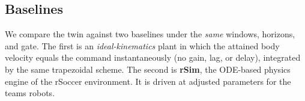 \subsection{Baselines}
\label{sec:method:baselines}
We compare the twin against two baselines under the \emph{same} windows, horizons, and gate. The first is an \emph{ideal-kinematics} plant in which the attained body velocity equals the command instantaneously (no gain, lag, or delay), integrated by the same trapezoidal scheme. The second is \textbf{rSim}, the ODE-based physics engine of the rSoccer environment. It is driven at adjusted parameters for the teams robots.


